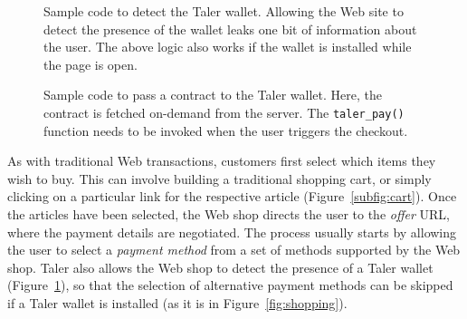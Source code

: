 \documentclass{llncs}
\begin{document}
{}

\begin{figure}[t!]
 \lstset{language=HTML5}
 
 \caption{Sample code to detect the Taler wallet. Allowing the
  Web site to detect the presence of the wallet leaks one bit
  of information about the user. The above logic also works
  if the wallet is installed while the page is open.}
  \label{listing:presence}
\end{figure}


\begin{figure}[t!]
 \lstset{language=HTML5}
 
 \caption{Sample code to pass a contract to the Taler wallet.
          Here, the contract is fetched on-demand from the server.
          The {\tt taler\_pay()} function needs to be invoked
          when the user triggers the checkout.}
 \label{listing:contract}
\end{figure}


As with traditional Web transactions, customers first select which
items they wish to buy.  This can involve building a traditional
shopping cart, or simply clicking on a particular link for the
respective article (Figure~\ref{subfig:cart}).  Once the articles have
been selected, the Web shop directs the user to the {\em offer} URL,
where the payment details are negotiated.  The process usually starts
by allowing the user to select a {\em payment method} from a set of
methods supported by the Web shop.  Taler also allows the Web shop to
detect the presence of a Taler wallet (Figure~\ref{listing:presence}),
so that the selection of alternative payment methods can be skipped if
a Taler wallet is installed (as it is in Figure~\ref{fig:shopping}).
\end{document}
